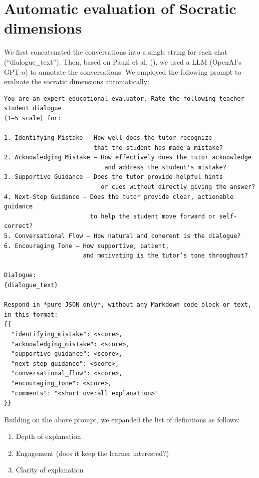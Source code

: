 \documentclass[
  12pt,
]{article}
\providecommand{\tightlist}{%
  \setlength{\itemsep}{0pt}\setlength{\parskip}{0pt}}
\begin{document}
\section{Automatic evaluation of Socratic dimensions}\label{sec:socratic-dimension}

We first concatenated the conversations into a single string for each chat (``dialogue\_text''). Then, based on Pauzi et al. (), we used a LLM (OpenAI's GPT-o) to annotate the conversations. We employed the following prompt to evaluate the socratic dimensions automatically:

\begin{verbatim}
You are an expert educational evaluator. Rate the following teacher-student dialogue 
(1–5 scale) for:

1. Identifying Mistake — How well does the tutor recognize 
                         that the student has made a mistake?
2. Acknowledging Mistake — How effectively does the tutor acknowledge 
                            and address the student's mistake?
3. Supportive Guidance — Does the tutor provide helpful hints
                           or cues without directly giving the answer?
4. Next-Step Guidance — Does the tutor provide clear, actionable guidance 
                        to help the student move forward or self-correct?
5. Conversational Flow — How natural and coherent is the dialogue?
6. Encouraging Tone — How supportive, patient, 
                      and motivating is the tutor’s tone throughout?

Dialogue:
{dialogue_text}

Respond in *pure JSON only*, without any Markdown code block or text, in this format:
{{
  "identifying_mistake": <score>,
  "acknowledging_mistake": <score>,
  "supportive_guidance": <score>,
  "next_step_guidance": <score>,
  "conversational_flow": <score>,
  "encouraging_tone": <score>,
  "comments": "<short overall explanation>"
}}
\end{verbatim}

Building on the above prompt, we expanded the list of definitions as follows:

\begin{enumerate}
\def\labelenumi{\arabic{enumi}.}
\tightlist
\item
  Depth of explanation
\item
  Engagement (does it keep the learner interested?)
\item
  Clarity of explanation
\end{enumerate}
\end{document}
